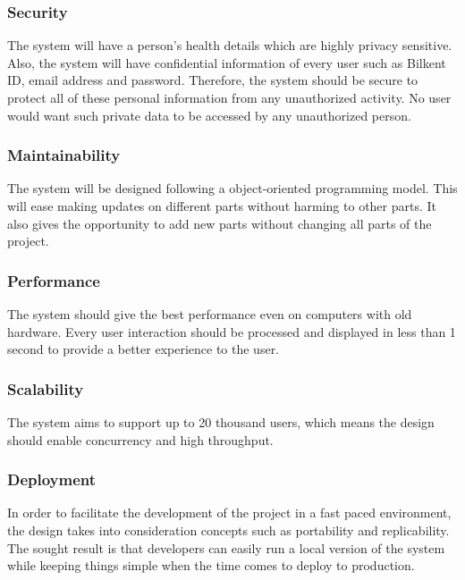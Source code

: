 \documentclass[a4paper, 12pt, titlepage]{article}
\begin{document}
  \subsubsection{Security}

  The system will have a person's health details which are highly privacy sensitive.
  Also, the system will have confidential information of every user such as Bilkent ID,
  email address and password. Therefore, the system should be secure to protect
  all of these personal information from any unauthorized activity.
  No user would want such private data to be accessed by any unauthorized person.

  \subsubsection{Maintainability}

  The system will be designed following a object-oriented programming model.
  This will ease making updates on different parts without harming to other parts.
  It also gives the opportunity to add new parts without changing all parts of the project.

  \subsubsection{Performance}

  The system should give the best performance even on computers with old hardware.
  Every user interaction should be processed and displayed in less than 1 second to provide
  a better experience to the user.

  \subsubsection{Scalability}

  The system aims to support up to 20 thousand users, which means the design should enable concurrency and high throughput.

  \subsubsection{Deployment}

  In order to facilitate the development of the project in a fast paced environment,
  the design takes into consideration concepts such as portability and replicability.
  The sought result is that developers can easily run a local version of the system while
  keeping things simple when the time comes to deploy to production.
\end{document}
